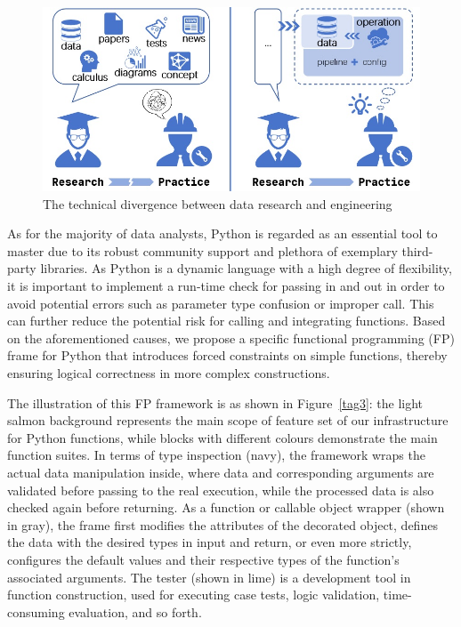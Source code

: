 \documentclass[a4paper,12pt]{article}
\newcommand{\myfig}[1]{{\color{black}Figure~\ref{#1}}}
\begin{document}
\begin{figure}[htbp]
  \centering
  \includegraphics[scale=0.95]{obstacle.jpg}
  \caption{The technical divergence between data research and engineering}
  \label{tag2}
\end{figure}

As for the majority of data analysts, Python is regarded as an essential tool to master due to its robust community support and plethora of exemplary third-party libraries. As Python is a dynamic language with a high degree of flexibility, it is important to implement a run-time check for passing in and out in order to avoid potential errors such as parameter type confusion or improper call. This can further reduce the potential risk for calling and integrating functions.  Based on the aforementioned causes, we propose a specific functional programming (FP) frame for Python that introduces forced constraints on simple functions, thereby ensuring logical correctness in more complex constructions.\par

The illustration of this FP framework is as shown in \myfig{tag3}: the light salmon background represents the main scope of feature set of our infrastructure for Python functions, while blocks with different colours demonstrate the main function suites. In terms of type inspection (navy), the framework wraps the actual data manipulation inside, where data and corresponding arguments are validated before passing to the real execution, while the processed data is also checked again before returning. As a function or callable object wrapper (shown in gray), the frame first modifies the attributes of the decorated object, defines the data with the desired types in input and return, or even more strictly, configures the default values and their respective types of the function's associated arguments. The tester (shown in lime) is a development tool in function construction, used for executing case tests, logic validation, time-consuming evaluation, and so forth.\par
\end{document}

